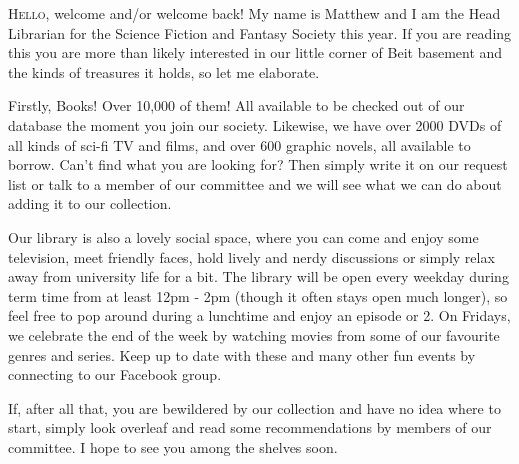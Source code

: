 \lettrine[lines=3]{H}{ello,} welcome and/or welcome back! My name is Matthew and I am the Head Librarian for the Science Fiction and Fantasy Society this year. If you are reading this you are more than likely interested in our little corner of Beit basement and the kinds of treasures it holds, so let me elaborate.

Firstly, Books! Over 10,000 of them! All available to be checked out of our database the moment you join our society. Likewise, we have over 2000 DVDs of all kinds of sci-fi TV and films, and over 600 graphic novels, all available to borrow. Can't find what you are looking for? Then simply write it on our request list or talk to a member of our committee and we will see what we can do about adding it to our collection.

Our library is also a lovely social space, where you can come and enjoy some television, meet friendly faces, hold lively and nerdy discussions or simply relax away from university life for a bit. The library will be open every weekday during term time from at least 12pm - 2pm (though it often stays open much longer), so feel free to pop around during a lunchtime and enjoy an episode or 2. On Fridays, we celebrate the end of the week by watching movies from some of our favourite genres and series. Keep up to date with these and many other fun events by connecting to our Facebook group.

If, after all that, you are bewildered by our collection and have no idea where to start, simply look overleaf and read some recommendations by members of our committee. I hope to see you among the shelves soon.
